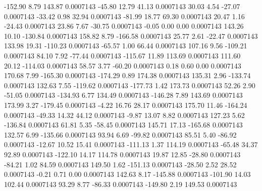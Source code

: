      -152.90        8.79      143.87     0.0007143
      -45.80       12.79       41.13     0.0007143
       30.03        4.54      -27.07     0.0007143
      -33.42        0.98       32.94     0.0007143
      -81.99       18.77       69.30     0.0007143
       20.47        1.16      -24.43     0.0007143
       23.86        7.67      -30.75     0.0007143
       -0.05        0.00        0.00     0.0007143
      143.26       10.10     -130.84     0.0007143
      158.82        8.79     -166.58     0.0007143
       25.77        2.61      -22.47     0.0007143
      133.98       19.31     -110.23     0.0007143
      -65.57        1.00       66.44     0.0007143
      107.16        9.56     -109.21     0.0007143
       84.10        7.92      -77.44     0.0007143
     -115.67       11.89      113.69     0.0007143
      111.60       20.12     -114.03     0.0007143
       58.57        3.77      -60.20     0.0007143
        0.18        0.60        0.00     0.0007143
      170.68        7.99     -165.30     0.0007143
     -174.29        0.89      174.38     0.0007143
      135.31        2.96     -133.74     0.0007143
      132.63        7.55     -119.62     0.0007143
     -177.73        1.42      173.73     0.0007143
       52.26        2.90      -51.05     0.0007143
     -134.93        6.77      134.49     0.0007143
     -146.28        7.89      143.69     0.0007143
      173.99        3.27     -179.45     0.0007143
       -4.22       16.76       28.17     0.0007143
      175.70       11.46     -164.24     0.0007143
      -49.33       14.32       44.12     0.0007143
       -9.87       13.07        8.82     0.0007143
      127.23        5.62     -136.84     0.0007143
       61.81        5.35      -58.45     0.0007143
      145.71       17.13     -165.68     0.0007143
      132.57        6.99     -135.66     0.0007143
       93.94        6.69      -99.82     0.0007143
       85.51        5.40      -86.92     0.0007143
      -12.67       10.52       15.41     0.0007143
     -111.13        1.37      114.19     0.0007143
      -65.48       34.37       92.89     0.0007143
     -122.10       14.17      114.78     0.0007143
       19.87       12.85      -28.80     0.0007143
      -84.21        1.02       84.59     0.0007143
      149.50        1.62     -151.13     0.0007143
      -28.50        2.52       28.52     0.0007143
       -0.21        0.71        0.00     0.0007143
      142.63        8.17     -145.88     0.0007143
     -101.90       14.03      102.44     0.0007143
       93.29        8.77      -86.33     0.0007143
     -149.80        2.19      149.53     0.0007143
